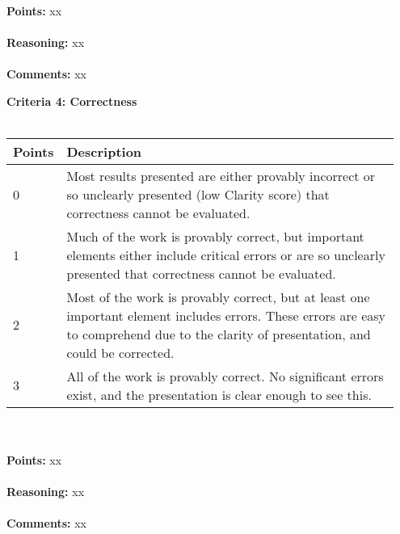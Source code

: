 \documentclass{article}
\begin{document}
\hspace{1cm} \\
\textbf{\large Points: } xx \\

\hspace{1cm} \\
\textbf{\large Reasoning: } xx \\

\hspace{1cm} \\
\textbf{\large Comments: } xx \\

\pagebreak


\textbf{\large Criteria 4: Correctness} \\
\hspace{1cm} \\
\begin{tabular}{|p{0.075\linewidth}||p{0.875\linewidth}|}
    \hline
    \textbf{Points} & \textbf{Description} \\
    \hline
    \hline
    0      & Most results presented are either provably incorrect or so unclearly presented (low Clarity score) that correctness cannot be evaluated. \\
    \hline
    1      & Much of the work is provably correct, but important elements either include critical errors or are so unclearly presented that correctness cannot be evaluated. \\
    \hline
    2      & Most of the work is provably correct, but at least one important element includes errors. These errors are easy to comprehend due to the clarity of presentation, and could be corrected. \\
    \hline
    3      & All of the work is provably correct. No significant errors exist, and the presentation is clear enough to see this. \\
    \hline
\end{tabular} \\

\hspace{1cm} \\
\textbf{\large Points: } xx \\

\hspace{1cm} \\
\textbf{\large Reasoning: } xx \\

\hspace{1cm} \\
\textbf{\large Comments: } xx \\
\end{document}
